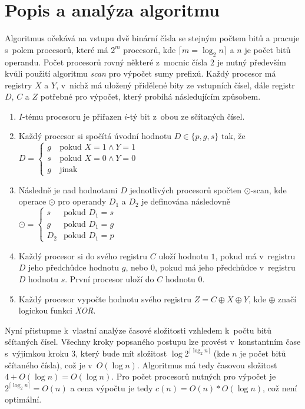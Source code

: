 \documentclass[a4paper, 12pt]{article}
\begin{document}
\section{Popis a analýza algoritmu}
\label{sec:analysis}
Algoritmus očekává na vstupu dvě binární čísla se stejným počtem bitů a pracuje s~polem
procesorů, které má $2^m$ procesorů, kde $\lceil m=\log_{2}{n} \rceil$ a $n$ je počet bitů operandu.
Počet procesorů rovný některé z~mocnic čísla $2$ je nutný především kvůli použití algoritmu \emph{scan}
pro výpočet sumy prefixů.
Každý procesor má registry $X$ a $Y$, v~nichž má uložený přidělené bity ze vstupních čísel,
dále registr $D$, $C$ a $Z$ potřebné pro výpočet, který probíhá následujícím způsobem.
\begin{enumerate}
    \item $I$-tému procesoru je přiřazen $i$-tý bit z~obou ze sčítaných čísel.
    \item Každý procesor si spočítá úvodní hodnotu $D\in \{p,g,s\}$ tak, že $D=
        \left\{
        \begin{array}{ll}
             g & \mbox{pokud } X=1 \wedge Y=1 \\
             s~& \mbox{pokud } X=0 \wedge Y=0 \\
             g & \mbox{jinak}
        \end{array}
        \right.
        $
    \item Následně je nad hodnotami $D$ jednotlivých procesorů spočten $\odot$-scan, kde
        operace $\odot$ pro operandy $D_1$ a $D_2$ je definována následovně $\odot=
        \left\{
        \begin{array}{ll}
             s~& \mbox{pokud } D_1=s \\
             g~& \mbox{pokud } D_1=g \\
             D_2 & \mbox{pokud } D_1=p
        \end{array}
        \right.
        $
    \item Každý procesor si do svého registru $C$ uloží hodnotu $1$, pokud má v~registru $D$ jeho
    předchůdce hodnotu $g$, nebo $0$, pokud má jeho předchůdce v~registru $D$ hodnotu $s$.
    První procesor uloží do $C$ hodnotu $0$.
    \item Každý procesor vypočte hodnotu svého registru $Z=C\oplus X \oplus Y$, kde $\oplus$
    značí logickou funkci \emph{XOR}.
\end{enumerate}
Nyní přistupme k~vlastní analýze časové složitosti vzhledem k~počtu bitů sčítaných čísel.
Všechny kroky popsaného postupu lze provést v~konstantním čase s~výjimkou kroku $3$, který
bude mít složitost $\log{2^{\lceil \log_{2}{n} \rceil}}$ (kde $n$ je počet bitů sčítaného čísla), což
je v~$O(\log{n})$.
Algoritmus má tedy časovou složitost $4+O(\log{n})=O(\log{n})$.
Pro počet procesorů nutných pro výpočet je $2^{\lceil \log_{2}{n} \rceil}=O(n)$
a cena výpočtu je tedy $c(n)=O(n)*O(\log{n})$, což není optimální.
\end{document}
